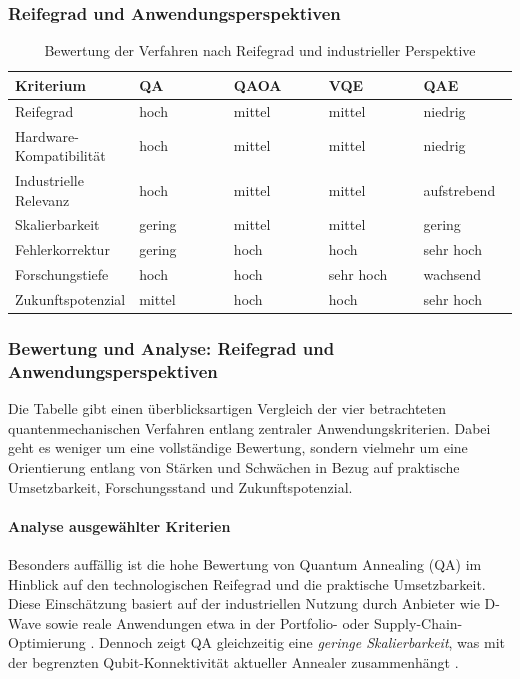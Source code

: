 \subsubsection*{Reifegrad und Anwendungsperspektiven}

\begin{table}[H]
\centering
\caption{Bewertung der Verfahren nach Reifegrad und industrieller Perspektive}
\renewcommand{\arraystretch}{1.2}
\begin{tabular}{|p{0.24\linewidth}|p{0.19\linewidth}|p{0.19\linewidth}|p{0.19\linewidth}|p{0.19\linewidth}|}
\hline
\textbf{Kriterium} & \textbf{QA} & \textbf{QAOA} & \textbf{VQE} & \textbf{QAE} \\
\hline
Reifegrad & hoch & mittel & mittel & niedrig \\
\hline
Hardware-Kompatibilität & hoch & mittel & mittel & niedrig \\
\hline
Industrielle Relevanz & hoch & mittel & mittel & aufstrebend \\
\hline
Skalierbarkeit & gering & mittel & mittel & gering \\
\hline
Fehlerkorrektur & gering & hoch & hoch & sehr hoch \\
\hline
Forschungstiefe & hoch & hoch & sehr hoch & wachsend \\
\hline
Zukunftspotenzial & mittel & hoch & hoch & sehr hoch \\
\hline
\end{tabular}
\end{table}


\subsubsection*{Bewertung und Analyse: Reifegrad und Anwendungsperspektiven}

Die Tabelle gibt einen überblicksartigen Vergleich der vier betrachteten quantenmechanischen Verfahren entlang zentraler Anwendungskriterien. Dabei geht es weniger um eine vollständige Bewertung, sondern vielmehr um eine Orientierung entlang von Stärken und Schwächen in Bezug auf praktische Umsetzbarkeit, Forschungsstand und Zukunftspotenzial.



\paragraph{Analyse ausgewählter Kriterien}

Besonders auffällig ist die hohe Bewertung von Quantum Annealing (QA) im Hinblick auf den technologischen Reifegrad und die praktische Umsetzbarkeit. Diese Einschätzung basiert auf der industriellen Nutzung durch Anbieter wie D-Wave sowie reale Anwendungen etwa in der Portfolio- oder Supply-Chain-Optimierung \cite{mugel_dynamic_2022, sakuler_real-world_2025}. Dennoch zeigt QA gleichzeitig eine \emph{geringe Skalierbarkeit}, was mit der begrenzten Qubit-Konnektivität aktueller Annealer zusammenhängt \cite{sakuler_real-world_2025}.

